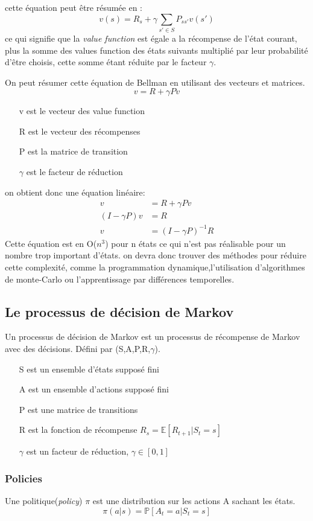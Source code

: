 \documentclass[a4paper,10pt]{article}
\begin{document}
cette équation peut être résumée en :
\[v(s)=R_s + \gamma \sum_{s'\in S} P_{ss'}v(s')\]
ce qui signifie que la \textit{value function} est égale a la récompense de l'état courant, plus la somme des values function des états suivants multiplié par leur probabilité d'être choisis, cette somme étant réduite par le facteur $\gamma$.\par
On peut résumer cette équation de Bellman en utilisant des vecteurs et matrices.
\[v=R+\gamma Pv\]
\begin{itemize}
\item[v] est le vecteur des value function
\item[R] est le vecteur des récompenses
\item[P] est la matrice de transition
\item[$\gamma$] est le facteur de réduction
\end{itemize}
on obtient donc une équation linéaire:
\[
\begin{aligned}
v &= R+ \gamma P v\\
(I - \gamma P)v &= R\\
v &= (I - \gamma P)^{-1} R
\end{aligned}
\]
Cette équation est en O($n^3$) pour n états ce qui n'est pas réalisable pour un nombre trop important d'états. on devra donc trouver des méthodes pour réduire cette complexité, comme la programmation dynamique,l'utilisation d'algorithmes de monte-Carlo ou l'apprentissage par différences temporelles.
\subsection{Le processus de décision de Markov}
Un processus de décision de Markov est un processus de récompense de Markov avec des décisions. Défini par (S,A,P,R,$\gamma$).
\begin{itemize}
\item[S] est un ensemble d'états supposé fini
\item[A] est un ensemble d'actions supposé fini
\item[P] est une matrice de transitions 
\item[R] est la fonction de récompense $R_s = \mathbb{E}[R_{t+1}|S_t =s]$
\item[$\gamma$] est un facteur de réduction, $\gamma \in [0,1]$
\end{itemize}
\vspace{12pt}
\subsubsection{Policies}
Une politique(\textit{policy}) $\pi$ est une distribution sur les actions A sachant les états.
\[
\pi (a|s) = \mathbb{P}[A_t = a | S_t =s]
\]
\end{document}
